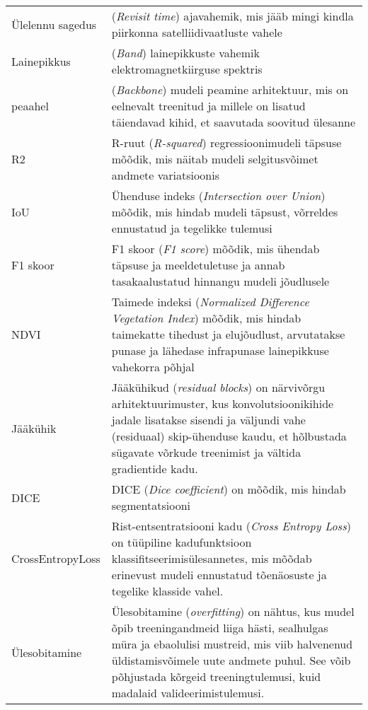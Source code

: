 \begin{longtable}{p{3cm}p{10cm}}  %
Ülelennu sagedus & (\textit{Revisit time}) ajavahemik, mis jääb mingi kindla
piirkonna satelliidivaatluste vahele\\
Lainepikkus & (\textit{Band}) lainepikkuste vahemik elektromagnetkiirguse spektris \\
peaahel & (\textit{Backbone}) mudeli peamine arhitektuur, mis on eelnevalt treenitud
ja millele on lisatud täiendavad kihid, et saavutada soovitud ülesanne\\
R2 & R-ruut (\textit{R-squared}) regressioonimudeli täpsuse mõõdik, mis näitab
mudeli selgitusvõimet andmete variatsioonis\\
IoU & Ühenduse indeks (\textit{Intersection over Union}) mõõdik, mis hindab
mudeli täpsust, võrreldes ennustatud ja tegelikke tulemusi\\
F1 skoor & F1 skoor (\textit{F1 score}) mõõdik, mis ühendab täpsuse ja
meeldetuletuse ja annab tasakaalustatud hinnangu mudeli jõudlusele\\
NDVI & Taimede indeksi (\textit{Normalized Difference Vegetation Index}) mõõdik, mis
hindab taimekatte tihedust ja elujõudlust, arvutatakse punase ja lähedase
infrapunase lainepikkuse vahekorra põhjal\\
Jääkühik & Jääkühikud (\textit{residual blocks}) on närvivõrgu arhitektuurimuster, kus konvolutsioonikihide jadale lisatakse sisendi ja väljundi vahe (residuaal) skip-ühenduse kaudu, et hõlbustada sügavate võrkude treenimist ja vältida gradientide kadu. \\
DICE & DICE (\textit{Dice coefficient}) on mõõdik, mis hindab segmentatsiooni \\
CrossEntropyLoss & Rist-entsentratsiooni kadu (\textit{Cross Entropy Loss}) on
tüüpiline kadufunktsioon klassifitseerimisülesannetes, mis mõõdab erinevust mudeli ennustatud tõenäosuste ja tegelike klasside vahel. \\
Ülesobitamine & Ülesobitamine (\textit{overfitting})  on nähtus, kus mudel õpib treeningandmeid liiga hästi, sealhulgas müra ja ebaolulisi mustreid, mis viib halvenenud üldistamisvõimele uute andmete puhul. See võib põhjustada kõrgeid treeningtulemusi, kuid madalaid valideerimistulemusi. \\
\end{longtable}
\addtocounter{table}{-1} %
